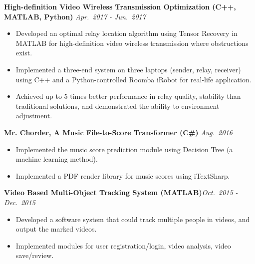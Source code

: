 \documentclass[10pt]{article}
\newenvironment{changemargin}[2]{%
  \begin{list}{}{%
    \setlength{\topsep}{0pt}%
    \setlength{\leftmargin}{#1}%
    \setlength{\rightmargin}{#2}%
    \setlength{\listparindent}{\parindent}%
    \setlength{\itemindent}{\parindent}%
    \setlength{\parsep}{\parskip}%
  }%
  \item[]}{\end{list}
}
\newenvironment{body} {
	\vspace*{-16pt}
	\begin{changemargin}{-0.65in}{-0.62in}
  }	
	{\end{changemargin}
}
\begin{document}
\begin{body}
	\vspace{14pt}
	
	\textbf{High-definition Video Wireless Transmission Optimization (C++, MATLAB, Python)} \hfill \emph{Apr.~2017 - Jun.~2017}
	\vspace*{-5pt}
	\begin{itemize} \itemsep -0pt		
		
		\item Developed an optimal relay location algorithm using Tensor Recovery in MATLAB for high-definition video wireless transmission where obstructions exist.
		\item Implemented a three-end system on three laptops (sender, relay, receiver) using C++ and a Python-controlled Roomba iRobot for real-life application.
		\item Achieved up to 5 times better performance in relay quality, stability than traditional solutions, and demonstrated the ability to environment adjustment.
	\end{itemize}
	
	\vspace{-2pt}
	
	\textbf{Mr. Chorder, A Music File-to-Score Transformer (C\#)} \hfill \emph{Aug.~2016}
	\vspace*{-5pt}
	\begin{itemize} \itemsep -0pt		
		
		\item Implemented the music score prediction module using Decision Tree (a machine learning method).
		\item Implemented a PDF render library for music scores using iTextSharp.
	\end{itemize}
	
	\vspace{-2pt}	
	
	\textbf{Video Based Multi-Object Tracking System (MATLAB)}\hfill \emph{Oct.~2015 - Dec.~2015}\\
	\vspace*{-5pt}
	\begin{itemize} \itemsep -0pt		
	  
      \item Developed a software system that could track multiple people in videos, and output the marked videos.
      \item Implemented modules for user registration/login, video analysis, video save/review.
      

\end{itemize}
\end{body}
\end{document}
